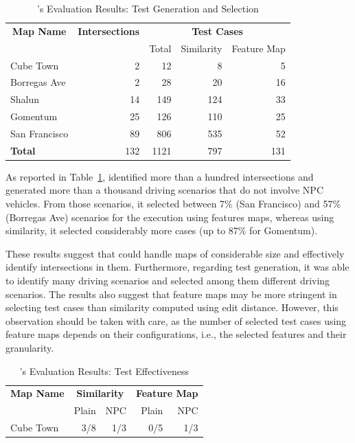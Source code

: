\documentclass[conference]{IEEEtran}
\begin{document}
\begin{table}[t]
    \centering
      \caption{\tool's Evaluation Results: Test Generation and Selection}
      \label{tab:results-generation}
      \begin{tabular}{lrrrr}
        \toprule
        \multicolumn{1}{c}{\textbf{Map Name}}&
        \multicolumn{1}{c}{\textbf{Intersections}}&
        \multicolumn{3}{c}{\textbf{Test Cases}}\\ \cmidrule(lr){3-5}
        & & Total & Similarity & Feature Map\\
        \midrule
        Cube Town & 2 & 12 & 8 & 5\\
        Borregas Ave & 2 & 28 & 20 & 16\\
        Shalun & 14 & 149 & 124 & 33\\
        Gomentum & 25 & 126 & 110 & 25\\
        San Francisco & 89 & 806 & 535 & 52\\
        \midrule 
        \textbf{Total} & 132 & 1121 & 797 & 131\\
        \bottomrule
      \end{tabular}
\end{table}

As reported in Table~\ref{tab:results-generation}, \tool identified more than a hundred intersections and generated more than a thousand driving scenarios that do not involve NPC vehicles. From those scenarios, it selected between 7\% (San Francisco) and 57\% (Borregas Ave) scenarios for the execution using features maps, whereas using similarity, it selected considerably more cases (up to 87\% for Gomentum).

These results suggest that \tool could handle maps of considerable size and effectively identify intersections in them. Furthermore, regarding test generation, it was able to identify many driving scenarios and selected among them different driving scenarios. The results also suggest that feature maps may be more stringent in selecting test cases than similarity computed using edit distance. However, this observation should be taken with care, as the number of selected test cases using feature maps depends on their configurations, i.e., the selected features and their granularity.

\begin{table}[t]
    \centering
      \caption{\tool's Evaluation Results: Test Effectiveness}
      \label{tab:results-effectiveness}
      \begin{tabular}{l rr rr}
        \toprule
        \multicolumn{1}{c}{\textbf{Map Name}} &
        \multicolumn{2}{c}{\textbf{Similarity}} & %
	\multicolumn{2}{c}{\textbf{Feature Map}}\\ \cmidrule(lr){2-3}\cmidrule(lr){4-5}
        & Plain & NPC & Plain & NPC \\
        \midrule
        Cube Town  & 3/8 & 1/3 & 0/5 & 1/3\\
        \bottomrule
      \end{tabular}
\end{table}
\end{document}
